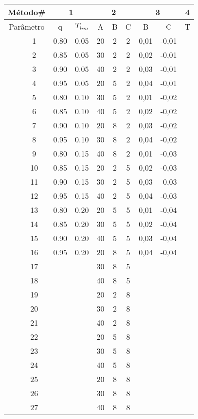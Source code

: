 \begin{table}[htb]
{
	\begin{tabular}{cc|cc|ccc|cc|c}
		\toprule
		\multicolumn{2}{c}{Método\#} & \multicolumn{2}{c}{1} & \multicolumn{3}{c}{2} & \multicolumn{2}{c}{3} & 4\\
		\midrule
		\multicolumn{2}{c}{Parâmetro}	&q&$T_{lim}$&A&B&C&B&C&T \\
		\midrule \midrule					
		\multirow{27}{*}{\rotatebox{90}{Índice da Combinação}} &
		 1 &0.80&0.05&20 & 2 & 2&0,01	&-0,01&\\
		&2 &0.85&0.05&30 & 2 & 2&0,02	&-0,01&\\
		&3 &0.90&0.05&40 & 2 & 2&0,03	&-0,01&\\
		&4 &0.95&0.05&20 & 5 & 2&0,04	&-0,01&\\
		&5 &0.80&0.10&30 & 5 & 2&0,01	&-0,02&\\
		&6 &0.85&0.10&40 & 5 & 2&0,02	&-0,02&\\
		&7 &0.90&0.10&20 & 8 & 2&0,03	&-0,02&\\
		&8 &0.95&0.10&30 & 8 & 2&0,04	&-0,02&\\
		&9 &0.80&0.15&40 & 8 & 2&0,01	&-0,03&\\
		&10&0.85&0.15&20 & 2 & 5&0,02	&-0,03&\\
		&11&0.90&0.15&30 & 2 & 5&0,03	&-0,03&\\
		&12&0.95&0.15&40 & 2 & 5&0,04	&-0,03&\\
		&13&0.80&0.20&20 & 5 & 5&0,01	&-0,04&\\
		&14&0.85&0.20&30 & 5 & 5&0,02	&-0,04&\\
		&15&0.90&0.20&40 & 5 & 5&0,03	&-0,04&\\
		&16&0.95&0.20&20 & 8 & 5&0,04	&-0,04&\\
		&17&\-  &\-  &30 & 8 & 5&				&\\
		&18&\-  &\-  &40 & 8 & 5&				&\\
		&19&\-  &\-  &20 & 2 & 8&				&\\
		&20&\-  &\-  &30 & 2 & 8&				&\\
		&21&\-  &\-  &40 & 2 & 8&				&\\
		&22&\-  &\-  &20 & 5 & 8&				&\\
		&23&\-  &\-  &30 & 5 & 8&				&\\
		&24&\-  &\-  &40 & 5 & 8&				&\\
		&25&\-  &\-  &20 & 8 & 8&				&\\
		&26&\-  &\-  &30 & 8 & 8&				&\\
		&27&\-  &\-  &40 & 8 & 8&				&\\
		\bottomrule
	\end{tabular}
}{}
\end{table}
















